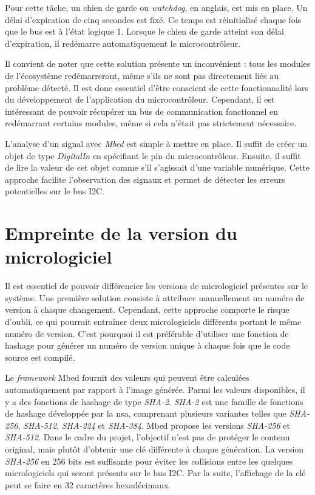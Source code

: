 Pour cette tâche, un chien de garde ou \textit{watchdog}, en anglais, est mis en place.
Un délai d'expiration de cinq secondes est fixé.
Ce temps est réinitialisé chaque fois que le bus est à l'état logique 1.
Lorsque le chien de garde atteint son délai d'expiration, il redémarre automatiquement le microcontrôleur.

Il convient de noter que cette solution présente un inconvénient : tous les modules de l'écosystème redémarreront, même s'ils ne sont pas directement liés au problème détecté.
Il est donc essentiel d'être conscient de cette fonctionnalité lors du développement de l'application du microcontrôleur.
Cependant, il est intéressant de pouvoir récupérer un bus de communication fonctionnel en redémarrant certains modules, même si cela n'était pas strictement nécessaire.

L'analyse d'un signal avec \textit{Mbed} est simple à mettre en place.
Il suffit de créer un objet de type \textit{DigitalIn} en spécifiant le pin du microcontrôleur.
Ensuite, il suffit de lire la valeur de cet objet comme s'il s'agissait d'une variable numérique.
Cette approche facilite l'observation des signaux et permet de détecter les erreurs potentielles sur le bus I2C.

\section{Empreinte de la version du micrologiciel}

Il est essentiel de pouvoir différencier les versions de micrologiciel présentes sur le système.
Une première solution consiste à attribuer manuellement un numéro de version à chaque changement.
Cependant, cette approche comporte le risque d'oubli, ce qui pourrait entraîner deux micrologiciels différents portant le même numéro de version.
C'est pourquoi il est préférable d'utiliser une fonction de hashage pour générer un numéro de version unique à chaque fois que le code source est compilé.

Le \textit{framework} Mbed fournit des valeurs qui peuvent être calculées automatiquement par rapport à l'image générée.
Parmi les valeurs disponibles, il y a des fonctions de hashage de type \textit{SHA-2}. \textit{SHA-2} est une famille de fonctions de hashage développée par la \gls{nsa}, comprenant plusieurs variantes telles que \textit{SHA-256}, \textit{SHA-512}, \textit{SHA-224} et \textit{SHA-384}.
Mbed propose les versions \textit{SHA-256} et \textit{SHA-512}.
Dans le cadre du projet, l'objectif n'est pas de protéger le contenu original, mais plutôt d'obtenir une clé différente à chaque génération.
La version \textit{SHA-256} en 256 bits est suffisante pour éviter les collisions entre les quelques micrologiciels qui seront présents sur le bus I2C.
Par la suite, l'affichage de la clé peut se faire en 32 caractères hexadécimaux.

